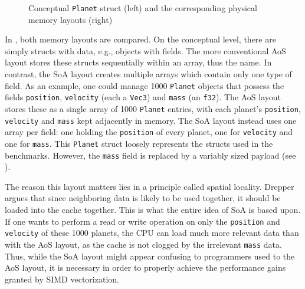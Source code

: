 \begin{figure}[htbp]
\caption{Conceptual \texttt{Planet} struct (left) and the corresponding physical memory layouts (right)}
\label{fig:background:memory-layout}
\end{figure}

In , both memory layouts are compared. On the conceptual level, there are simply structs with data, e.g., objects with fields. The more conventional \ac{AoS} layout stores these structs sequentially within an array, thus the name. In contrast, the \ac{SoA} layout creates multiple arrays which contain only one type of field. As an example, one could manage \num{1000} \texttt{Planet} objects that possess the fields \texttt{position}, \texttt{velocity} (each a \texttt{Vec3}) and \texttt{mass} (an \texttt{f32}). The \ac{AoS} layout stores these as a single array of \num{1000} \texttt{Planet} entries, with each planet's \texttt{position}, \texttt{velocity} and \texttt{mass} kept adjacently in memory. The \ac{SoA} layout instead uses one array per field: one holding the \texttt{position} of every planet, one for \texttt{velocity} and one for \texttt{mass}. This \texttt{Planet} struct loosely represents the structs used in the benchmarks. However, the \texttt{mass} field is replaced by a variably sized payload (see ).

The reason this layout matters lies in a principle called spatial locality. Drepper argues \cite{drepper2007every} that since neighboring data is likely to be used together, it should be loaded into the cache together. This is what the entire idea of \ac{SoA} is based upon. If one wants to perform a read or write operation on only the \texttt{position} and \texttt{velocity} of these \num{1000} planets, the CPU can load much more relevant data than with the \ac{AoS} layout, as the cache is not clogged by the irrelevant \texttt{mass} data. Thus, while the \ac{SoA} layout might appear confusing to programmers used to the \ac{AoS} layout, it is necessary in order to properly achieve the performance gains granted by \ac{SIMD} vectorization.

